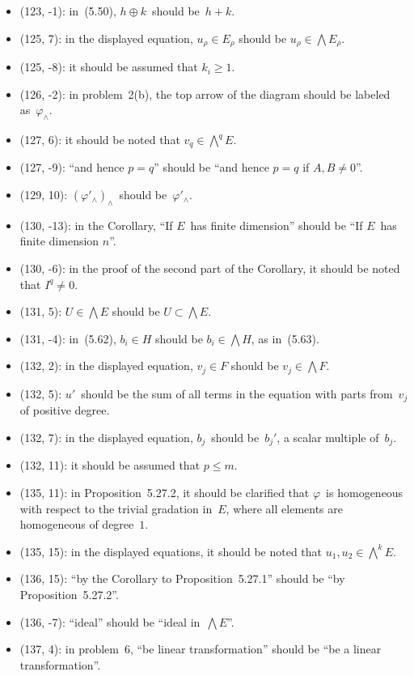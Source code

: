 \documentclass[letterpaper,12pt]{article}
\newcommand{\dsum}{\oplus}
\newcommand{\eprod}{\wedge}
\newcommand{\bigeprod}{\bigwedge}
\begin{document}
\begin{itemize}
\item (123, -1): in~(5.50), \(h\dsum k\)~should be~\(h+k\).
\item (125, 7): in the displayed equation, \(u_{\rho}\in E_{\rho}\) should be \(u_{\rho}\in\bigeprod E_{\rho}\).
\item (125, -8): it should be assumed that \(k_i\ge 1\).
\item (126, -2): in problem~2(b), the top arrow of the diagram should be labeled as~\(\varphi_{\eprod}\).
\item (127, 6): it should be noted that \(v_q\in\bigeprod^q E\).
\item (127, -9): ``and hence \(p=q\)'' should be ``and hence \(p=q\) if \(A,B\ne 0\)''.
\item (129, 10): \((\varphi'_{\eprod})_{\eprod}\)~should be~\(\varphi'_{\eprod}\).
\item (130, -13): in the Corollary, ``If \(E\)~has finite dimension'' should be ``If \(E\)~has finite dimension \(n\)''.
\item (130, -6): in the proof of the second part of the Corollary, it should be noted that \(I^q\ne 0\).
\item (131, 5): \(U\in\bigeprod E\) should be \(U\subset\bigeprod E\).
\item (131, -4): in~(5.62), \(b_i\in H\) should be \(b_i\in\bigeprod H\), as in~(5.63).
\item (132, 2): in the displayed equation, \(v_j\in F\) should be \(v_j\in\bigeprod F\).
\item (132, 5): \(u'\)~should be the sum of all terms in the equation with parts from~\(v_j\) of positive degree.
\item (132, 7): in the displayed equation, \(b_j\)~should be~\(b_j'\), a scalar multiple of~\(b_j\).
\item (132, 11): it should be assumed that \(p\le m\).
\item (135, 11): in Proposition~5.27.2, it should be clarified that \(\varphi\)~is homogeneous with respect to the trivial gradation in~\(E\), where all elements are homogeneous of degree~\(1\).
\item (135, 15): in the displayed equations, it should be noted that \(u_1,u_2\in\bigeprod^k E\).
\item (136, 15): ``by the Corollary to Proposition~5.27.1'' should be ``by Proposition~5.27.2''.
\item (136, -7): ``ideal'' should be ``ideal in~\(\bigeprod E\)''.
\item (137, 4): in problem~6, ``be linear transformation'' should be ``be a linear transformation''.

\end{itemize}
\end{document}
